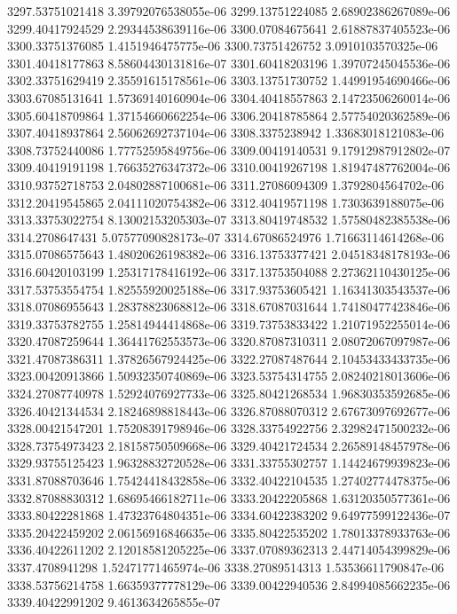 {3297.53751021418 3.39792076538055e-06
3299.13751224085 2.68902386267089e-06
3299.40417924529 2.29344538639116e-06
3300.07084675641 2.61887837405523e-06
3300.33751376085 1.4151946475775e-06
3300.73751426752 3.0910103570325e-06
3301.40418177863 8.58604430131816e-07
3301.60418203196 1.39707245045536e-06
3302.33751629419 2.35591615178561e-06
3303.13751730752 1.44991954690466e-06
3303.67085131641 1.57369140160904e-06
3304.40418557863 2.14723506260014e-06
3305.60418709864 1.37154660662254e-06
3306.20418785864 2.57754020362589e-06
3307.40418937864 2.56062692737104e-06
3308.3375238942 1.33683018121083e-06
3308.73752440086 1.77752595849756e-06
3309.00419140531 9.17912987912802e-07
3309.40419191198 1.76635276347372e-06
3310.00419267198 1.81947487762004e-06
3310.93752718753 2.04802887100681e-06
3311.27086094309 1.3792804564702e-06
3312.20419545865 2.04111020754382e-06
3312.40419571198 1.7303639188075e-06
3313.33753022754 8.13002153205303e-07
3313.80419748532 1.57580482385538e-06
3314.2708647431 5.07577090828173e-07
3314.67086524976 1.71663114614268e-06
3315.07086575643 1.48020626198382e-06
3316.13753377421 2.04518348178193e-06
3316.60420103199 1.25317178416192e-06
3317.13753504088 2.27362110430125e-06
3317.53753554754 1.82555920025188e-06
3317.93753605421 1.16341303543537e-06
3318.07086955643 1.28378823068812e-06
3318.67087031644 1.74180477423846e-06
3319.33753782755 1.25814944414868e-06
3319.73753833422 1.21071952255014e-06
3320.47087259644 1.36441762553573e-06
3320.87087310311 2.08072067097987e-06
3321.47087386311 1.37826567924425e-06
3322.27087487644 2.10453433433735e-06
3323.00420913866 1.50932350740869e-06
3323.53754314755 2.08240218013606e-06
3324.27087740978 1.52924076927733e-06
3325.80421268534 1.96830353592685e-06
3326.40421344534 2.18246898818443e-06
3326.87088070312 2.67673097692677e-06
3328.00421547201 1.75208391798946e-06
3328.33754922756 2.32982471500232e-06
3328.73754973423 2.18158750509668e-06
3329.40421724534 2.26589148457978e-06
3329.93755125423 1.96328832720528e-06
3331.33755302757 1.14424679939823e-06
3331.87088703646 1.75424418432858e-06
3332.40422104535 1.27402774478375e-06
3332.87088830312 1.68695466182711e-06
3333.20422205868 1.63120350577361e-06
3333.80422281868 1.47323764804351e-06
3334.60422383202 9.64977599122436e-07
3335.20422459202 2.06156916846635e-06
3335.80422535202 1.78013378933763e-06
3336.40422611202 2.12018581205225e-06
3337.07089362313 2.44714054399829e-06
3337.4708941298 1.52471771465974e-06
3338.27089514313 1.53536611790847e-06
3338.53756214758 1.66359377778129e-06
3339.00422940536 2.84994085662235e-06
3339.40422991202 9.4613634265855e-07
}
